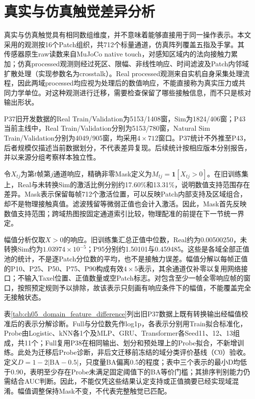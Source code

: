 \section{真实与仿真触觉差异分析}
\label{sec:ch05_real_sim_difference}

真实与仿真触觉具有相同数组维度，并不意味着能够直接用于同一操作表示。本文采用的观测按16个Patch组织，共712个标量通道，仿真阵列覆盖五指及手掌。其传感器原生raw读数来自MuJoCo native touch，对感知区域内的法向接触力累加\cite{mujoco2026xml}；仿真processed观测则经过死区、限幅、非线性响应、时间滤波及Patch内邻域扩散处理（实现参数名为crosstalk）。Real processed观测来自实机自身采集处理流程，因此两域processed均应视为处理后的数值响应，不能直接称为真实压力或共同力学单位。对这种观测进行迁移，需要检查保留了哪些接触信息，而不只是核对输出形状。

P37旧开发数据的Real Train/Validation为5153/1408窗，Sim为1824/406窗；P43当前主线中，Real Train/Validation分别为5153/780窗，Natural Sim Train/Validation分别为4049/905窗，均采用$4\times712$窗口。P37统计不外推至P43，后者规模仅描述当前数据划分，不代表差异复现。后续统计按相应版本分别报告，并以来源分组考察样本独立性。

令$X_{tj}$为第$t$帧第$j$通道响应，精确非零Mask定义为$M_{tj}=\mathbf1[X_{tj}>0]$。在旧训练集上，Real与未转换Sim的激活比例分别约17.60\%和13.31\%，说明数值支持范围存在差异。Mask表示保留每帧712个激活位置，可以反映Patch内部支持及区域组合，却不是物理接触真值。滤波残留等微弱正值也会计入激活。因此，Mask首先反映数值支持范围；跨域热图按固定通道索引比较，物理配准的前提在下一节统一界定。

幅值分析仅取$X>0$的响应。旧训练集汇总正值中位数，Real约为0.00500250，未转换Sim约为$1.03974\times10^{-5}$；P95分别约1.50101与0.459485。这些是各域全部正值池的统计，不是逐Patch分位数的平均，也不是接触力误差。幅值分解以每帧正值的P10、P25、P50、P75、P90构成有效$4\times5$表示，其余通道仅补零以复用网络接口；不输入Taxel位置、正值数量或空Patch标志。对包含至少一帧全零响应帧的窗口，按照预定规则予以排除，故该表示只刻画有响应条件下的幅值，不能覆盖完全无接触状态。

表\ref{tab:ch05_domain_feature_difference}列出旧P37数据上既有转换输出经幅值校准后的表示分解诊断。Full与分位数先作log1p，各表示分别用Train拟合标准化，Probe由Logistic、kNN各1个及MLP、GRU、Transformer各Seed11、12、13组成，共11个；Full复用P38在相同输出、划分和预处理上的Probe拟合，不新增训练。此处为迁移后Probe诊断，非后文迁移前冻结的域分类评价基线（C0）验收。定义$D=1-2|\mathrm{BA}-0.5|$，只度量BA偏离0.5的程度；表中三个表示的最小D均低于0.90，表明至少存在Probe未满足固定阈值下的BA等价门槛；其排序判别能力仍需结合AUC判断。因此，不能仅凭这些结果认定支持或正值摘要已经实现域混淆。幅值调整保持Mask不变，不代表完整触觉已匹配。

